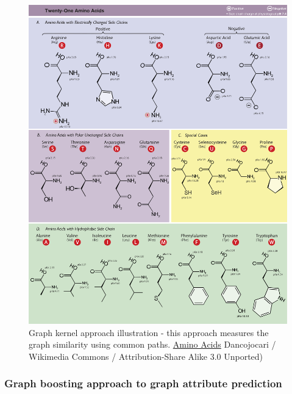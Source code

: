 \documentclass{article}
\begin{document}
\begin{figure}[H]\centering
	\includegraphics[width=\textwidth]{AminoAcids}
	\caption{
		Graph kernel approach illustration - this approach measures the graph similarity using common paths.
		\href{https://commons.wikimedia.org/wiki/File:Amino_Acids.svg}
		{Amino Acids}
		Dancojocari / Wikimedia Commons / Attribution-Share Alike 3.0 Unported)
	}
	\label{fig:AminoAcids}
\end{figure}

\subsubsection{Graph boosting approach to graph attribute prediction}
\end{document}
